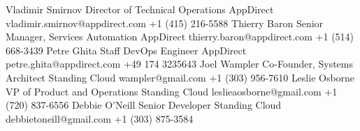 
\begin{referees}
		{Vladimir Smirnov}
		{Director of Technical Operations}
		{AppDirect}
		{vladimir.smirnov@appdirect.com}
    {+1 (415) 216-5588}
		{Thierry Baron}
		{Senior Manager, Services Automation}
		{AppDirect}
		{thierry.baron@appdirect.com}
    {+1 (514) 668-3439}
		{Petre Ghita}
		{Staff DevOps Engineer}
		{AppDirect}
		{petre.ghita@appdirect.com}
    {+49 174 3235643}
		{Joel Wampler}
		{Co-Founder, Systems Architect}
		{Standing Cloud}
		{wampler@gmail.com}
    {+1 (303) 956-7610}
		{Leslie Osborne}
		{VP of Product and Operations}
		{Standing Cloud}
		{leslieaosborne@gmail.com}
    {+1 (720) 837-6556}
		{Debbie O'Neill}
		{Senior Developer}
		{Standing Cloud}
		{debbietoneill@gmail.com}
    {+1 (303) 875-3584}
\end{referees}
